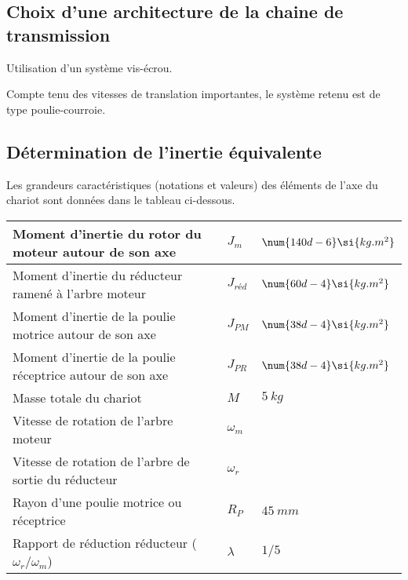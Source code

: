 \fi
\subsection*{Choix d'une architecture de la chaine de transmission}

\ifprof
\begin{corrige}
Utilisation d’un système vis-écrou.
\end{corrige}
\else
\fi

\ifprof
\else
Compte tenu des vitesses de translation importantes, le système retenu est de type poulie-courroie.
\fi

\subsection*{Détermination de l'inertie équivalente} 
\ifprof
\else

Les grandeurs caractéristiques (notations et valeurs) des éléments de l'axe du chariot sont données dans le tableau ci-dessous.
\begin{center}
\begin{tabular}{p{8cm}ll}
\hline
Moment d'inertie du rotor du moteur autour de son axe&	$J_m$ & $\num{140d-6}\si{kg.m^2}$ \\ \hline
Moment d'inertie du réducteur ramené à l'arbre moteur&	$J_{réd}$ & $\num{60d-4}\si{kg.m^2}$ \\ \hline
Moment d'inertie de la poulie motrice autour de son axe&	$J_{PM}$	&$ \num{38d-4}\si{kg.m^2}$ \\ \hline
Moment d'inertie de la poulie réceptrice autour de son axe&	$J_{PR}$ & $\num{38d-4}\si{kg.m^2}$ \\ \hline
Masse totale du chariot	&$M$ &$\SI{5}{kg}$ \\ \hline
Vitesse de rotation de l'arbre moteur &$\omega_m$ &  \\ \hline
Vitesse de rotation de l'arbre de sortie du réducteur	&$\omega_r$&  \\ \hline
Rayon d'une poulie motrice ou réceptrice	& $R_P$ &$\SI{45}{mm}$ \\ \hline
Rapport de réduction réducteur ($\omega_r/\omega_m$)	& $\lambda$	&$1/5$ \\ \hline
\end{tabular}
\end{center}
\fi

